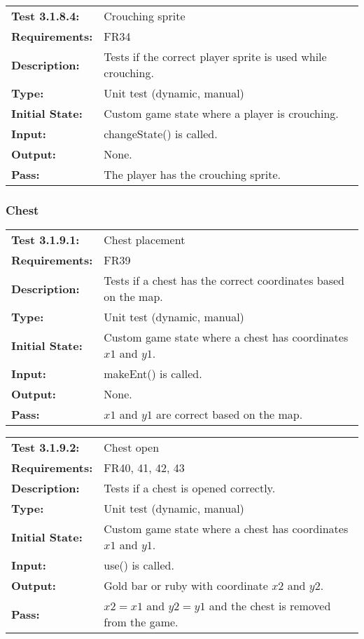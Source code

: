 \documentclass[12pt, titlepage]{article}
\begin{document}
\begin{tabular}{|l|p{10cm}|}
    \hline
    \bf{Test} 3.1.8.4: & Crouching sprite \\
    \bf{Requirements}: & FR34 \\
    \bf{Description}: & Tests if the correct player sprite is used while crouching. \\
    \bf{Type}: & Unit test (dynamic, manual) \\
    \bf{Initial State}: & Custom game state where a player is crouching. \\
    \bf{Input}: & changeState() is called. \\
    \bf{Output}: & None. \\
    \bf{Pass}: & The player has the crouching sprite. \\
    \hline
\end{tabular}

\subsubsection{Chest}

\begin{tabular}{|l|p{10cm}|}
    \hline
    \bf{Test} 3.1.9.1: & Chest placement \\
    \bf{Requirements}: & FR39 \\
    \bf{Description}: & Tests if a chest has the correct coordinates based on the map. \\
    \bf{Type}: & Unit test (dynamic, manual) \\
    \bf{Initial State}: & Custom game state where a chest has coordinates $x1$ and $y1$. \\
    \bf{Input}: & makeEnt() is called. \\
    \bf{Output}: & None. \\
    \bf{Pass}: & $x1$ and $y1$ are correct based on the map. \\
    \hline
\end{tabular}

\begin{tabular}{|l|p{10cm}|}
    \hline
    \bf{Test} 3.1.9.2: & Chest open \\
    \bf{Requirements}: & FR40, 41, 42, 43 \\
    \bf{Description}: & Tests if a chest is opened correctly. \\
    \bf{Type}: & Unit test (dynamic, manual) \\
    \bf{Initial State}: & Custom game state where a chest has coordinates $x1$ and $y1$. \\
    \bf{Input}: & use() is called. \\
    \bf{Output}: & Gold bar or ruby with coordinate $x2$ and $y2$. \\
    \bf{Pass}: & $x2 = x1$ and $y2 = y1$ and the chest is removed from the game. \\
    \hline
\end{tabular}
\end{document}
